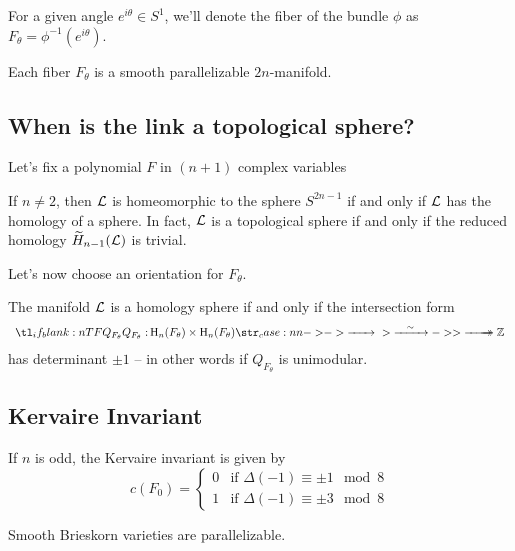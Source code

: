 For a given angle $e^{i\theta}\in S^1$, we'll denote the fiber of the bundle $\phi$ as $F_\theta = \phi^{-1}(e^{i\theta})$.

\begin{proposition}
	Each fiber $F_\theta$ is a smooth parallelizable $2n$-manifold.
\end{proposition}

\subsection{When is the link a topological sphere?}

Let's fix a polynomial $F$ in $(n+1)$ complex variables

\begin{proposition}
	If $n\neq 2$, then $\mathcal{L}$ is homeomorphic to the sphere $S^{2n-1}$ if and only if $\mathcal{L}$ has the homology of a sphere. In fact, $\mathcal{L}$ is a topological sphere if and only if the reduced homology $\widetilde{H}_{n-1}(\mathcal{L})$ is trivial.
\end{proposition}

Let's now choose an orientation for $F_\theta$.

\begin{proposition}
	The manifold $\mathcal{L}$ is a homology sphere if and only if the intersection form
	\[
		\lkxfunc{Q_{F_\theta}}{\H_n(F_\theta)\times \H_n(F_\theta)}{\Z}
	\]
	has determinant $\pm 1$ -- in other words if $Q_{F_\theta}$ is unimodular.
\end{proposition}

\subsection{Kervaire Invariant}

\begin{theorem}
\end{theorem}

\begin{theorem}[Levine]
	If $n$ is odd, the Kervaire invariant is given by
	\[
		c(F_0) = \begin{cases}
			0 & \textrm{if }\Delta(-1)\equiv \pm 1\mod 8 \\
			1 & \textrm{if }\Delta(-1)\equiv \pm 3\mod 8
		\end{cases}
	\]
\end{theorem}

\begin{theorem} Smooth Brieskorn varieties are parallelizable.
\end{theorem}
